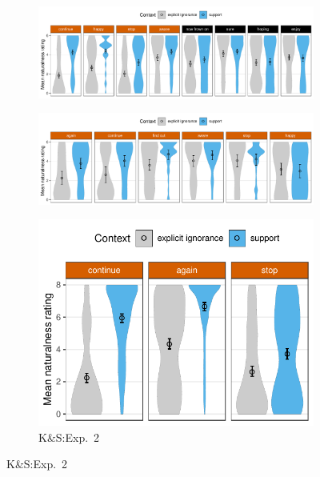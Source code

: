 \documentclass[11pt,fleqn]{article}
\newcommand{\6}{\mbox{$[\hspace*{-.6mm}[$}}
\newcommand{\9}{\mbox{$]\hspace*{-.6mm}]$}}
\begin{document}
\begin{figure}[h!]
\centering
\begin{subfigure}{.7\textwidth}
\centering
\includegraphics[width=1\textwidth]{../../../mandelkern-etal2020/graphs/naturalness-by-context-and-expression}
\caption{\citealt[Exp.~3]{mandelkern-etal2020}}
\end{subfigure}

\begin{subfigure}{.7\textwidth}
\centering
\includegraphics[width=1\textwidth]{../../../kalomoiros-schwarz2024/exp1/graphs/naturalness-by-context-and-expression} 
\caption{\citealt[Exp.~1]{kalomoiros-schwarz2024}}
\end{subfigure}%
\begin{subfigure}{.29\textwidth}
\centering
\includegraphics[width=1.05\textwidth]{../../../kalomoiros-schwarz2024/exp2/graphs/naturalness-by-context-and-expression}
\caption{K\&S:Exp.~2}
\end{subfigure}


\end{figure}
\end{document}

